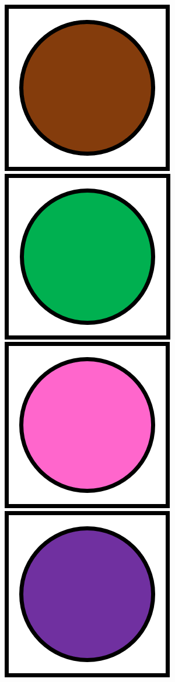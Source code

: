\documentclass[12pt,a4paper,openright]{book}
\theoremstyle{break}
\begin{document}
\begin{center}
\includegraphics[scale=0.65]{brownCube.png}
\includegraphics[scale=0.65]{greenCube.png}
\includegraphics[scale=0.65]{pinkCube.png}
\includegraphics[scale=0.65]{purpleCube.png}
\end{center}
\end{document}
